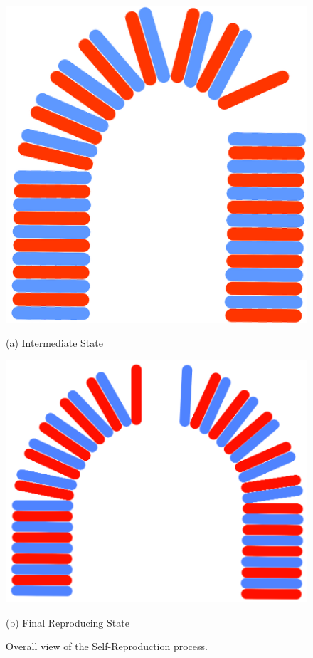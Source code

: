 \documentclass[lettersize,journal]{IEEEtran}
\begin{document}
\begin{itemize}
\begin{figure}[H]
  \begin{minipage}[b]{0.4\linewidth}
    \centering
    \includegraphics[width=\linewidth]{13_7.png}
    \caption*{(a) Intermediate State}
  \end{minipage}
  \hfill
  \begin{minipage}[b]{0.5\linewidth}
    \centering
    \includegraphics[width=\linewidth]{10_10.png}
    \caption*{(b) Final Reproducing State}
  \end{minipage}

  \caption{Overall view of the Self-Reproduction process.}
  \label{fig:combined}
\end{figure}

\end{itemize}
\end{document}
